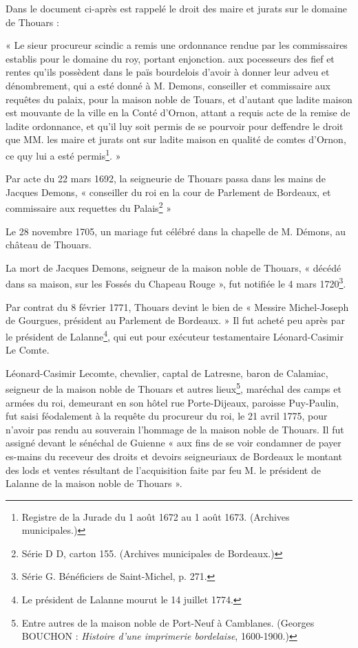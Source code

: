 \asterism{}

Dans le document ci-après est rappelé le droit des maire et jurats sur le domaine de Thouars :

« Le sieur procureur scindic a remis une ordonnance rendue par les commissaires establis pour le domaine du roy, portant enjonction. aux pocesseurs des fief et rentes qu'ils possèdent dans le païs bourdelois d'avoir à donner leur adveu et dénombrement, qui a esté donné à M. Demons, conseiller et commissaire aux requêtes du palaix, pour la maison noble de Touars, et d'autant que ladite maison est mouvante de la ville en la Conté d'Ornon, attant a requis acte de la remise de ladite ordonnance, et qu'il luy soit permis de se pourvoir pour deffendre le droit que MM. les maire et jurats ont sur ladite maison en qualité de comtes d'Ornon, ce quy lui a esté permis\footnote{Registre de la Jurade du 1\ier{} août 1672 au 1\ier{} août 1673. (Archives municipales.)}. » 

Par acte du 22 mars 1692, la seigneurie de Thouars passa dans les mains de Jacques Demons, « conseiller du roi en la cour de Parlement de Bordeaux, et commissaire aux requettes du Palais\footnote{Série D D, carton 155. (Archives municipales de Bordeaux.)} »

Le 28 novembre 1705, un mariage fut célébré dans la chapelle de M. Démons, au château de Thouars.

La mort de Jacques Demons, seigneur de la maison noble de Thouars, « décédé dans sa maison, sur les Fossés du Chapeau Rouge », fut notifiée le 4 mars 1720\footnote{Série G. Bénéficiers de Saint-Michel, p. 271.}.

Par contrat du 8 février 1771, Thouars devint le bien de « Messire Michel-Joseph de Gourgues, président au Parlement de Bordeaux. » Il fut acheté peu après par le président de Lalanne\footnote{Le président de Lalanne mourut le 14 juillet 1774.}, qui eut pour exécuteur testamentaire Léonard-Casimir Le Comte.

Léonard-Casimir Lecomte, chevalier, captal de Latresne, baron de Calamiac, seigneur de la maison noble de Thouars et autres lieux\footnote{Entre autres de la maison noble de Port-Neuf à Camblanes. (Georges BOUCHON : \textit{Histoire d'une imprimerie bordelaise}, 1600-1900.)}, maréchal des camps et armées du roi, demeurant en son hôtel rue Porte-Dijeaux, paroisse Puy-Paulin, fut saisi féodalement à la requête du procureur du roi, le 21 avril 1775, pour n'avoir pas rendu au souverain l'hommage de la maison noble de Thouars. Il fut assigné devant le sénéchal de Guienne « aux fins de se voir condamner de payer es-mains du receveur des droits et devoirs seigneuriaux de Bordeaux le montant des lods et ventes résultant de l'acquisition faite par feu M. le président de Lalanne de la maison noble de Thouars ».

